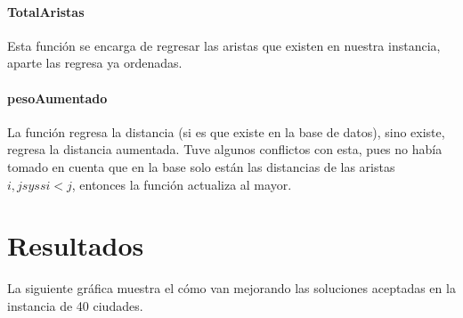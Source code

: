 \documentclass[
10pt,
a4paper,
oneside,
headinclude,footinclude,
BCOR5mm,
]{article}
\begin{document}
\paragraph{TotalAristas} Esta función se encarga de regresar las aristas que
existen en nuestra instancia, aparte las regresa ya ordenadas.

\paragraph{pesoAumentado} La función regresa la distancia (si es que existe en la
base de datos), sino existe, regresa la distancia aumentada. Tuve algunos
conflictos con esta, pues no había tomado en cuenta que en la base solo están las
distancias de las aristas $i,j syss i < j$, entonces la función actualiza al
mayor.

\section{Resultados}
La siguiente gráfica muestra el cómo van mejorando las soluciones aceptadas en la
instancia de 40 ciudades.\\
\end{document}

